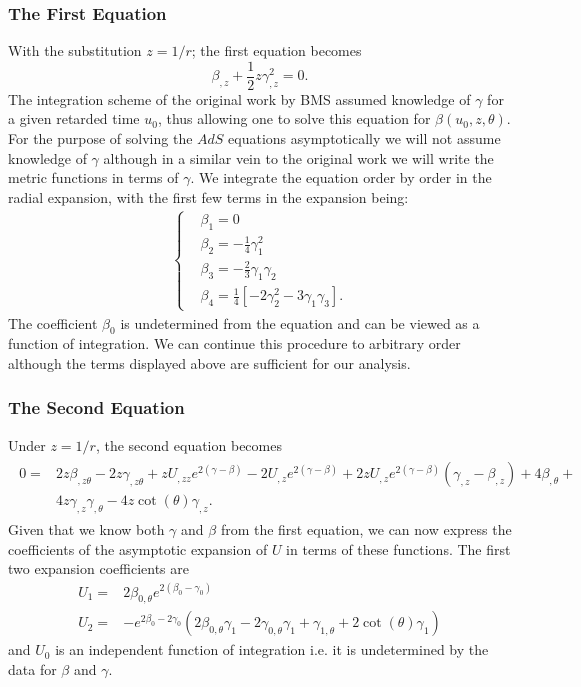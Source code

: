 \documentclass[a4paper,11pt]{article}
\numberwithin{equation}{section}
\begin{document}
\subsubsection{The First Equation}
\noindent With the substitution $z=1/r$; the first equation becomes 
\begin{equation}
\beta_{,z}+\frac{1}{2} z \gamma_{,z}^2=0.
\end{equation}
The integration scheme of the original work by BMS assumed knowledge of $\gamma$ for a given retarded time $u_0$, thus allowing one to solve this equation for $\beta(u_0, z,\theta)$. For the purpose of solving the $AdS$ equations asymptotically we will not assume knowledge of $\gamma$ although in a similar vein to the original work we will write the metric functions in terms of $\gamma$. We integrate the equation order by order in the radial expansion, with the first few terms in the expansion being: 
\begin{align}
\begin{cases}
&\beta_1=0 \\
&\beta_2=-\frac{1}{4} \gamma_1^2\\
& \beta_3=-\frac{2}{3}  \gamma_1 \gamma_2 \\
& \beta_4=\frac{1}{4}\left[ -2 \gamma_2^2-3 \gamma_1 \gamma_3 \right].
\end{cases}
\end{align}
The coefficient $\beta_0$ is undetermined from the equation and can be viewed as a function of integration. We can continue this procedure to arbitrary order although the terms displayed above are sufficient for our analysis.  

\subsubsection{The Second Equation}
\noindent Under $z=1/r$, the second equation becomes
\begin{align}
\begin{split}
0=& 2 z \beta_{,z \theta}-2 z\gamma_{, z\theta}+z U_{,zz}  e^{2(\gamma-\beta)}-2 U_{,z} e^{2(\gamma-\beta)}+ 2 z U_{,z} e^{2(\gamma-\beta)}(\gamma_{,z}-\beta_{,z})+4 \beta_{,\theta}+ \\
&4 z \gamma_{,z}  \gamma_{,\theta}-4 z \cot (\theta ) \gamma_{,z}.  
\end{split}
\end{align}
Given that we know both $\gamma$ and $\beta$ from the first equation, we can now express the coefficients of the asymptotic expansion of $U$ in terms of these functions. The first two expansion coefficients are
\begin{subequations}
\begin{align}
U_1=& 2 \beta_{0, \theta} e^{2( \beta_0- \gamma_0)} \\
U_2=&-e^{2 \beta_0-2 \gamma_0} (2 \beta_{0,\theta} \gamma_1-2 \gamma_{0,\theta}\gamma_1+\gamma_{1,\theta}+2 \cot (\theta ) \gamma_1)
\end{align}
\end{subequations}
and $U_0$ is an independent function of integration i.e. it is undetermined by the data for $\beta$ and $\gamma$. 
\end{document}
